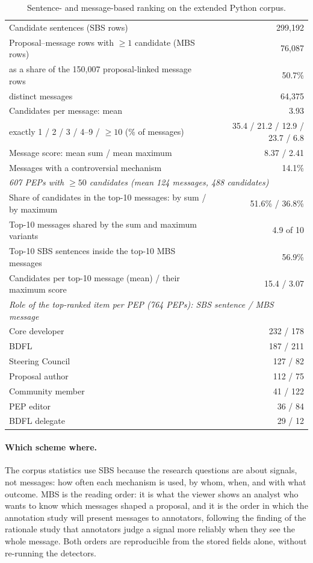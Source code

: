 \begin{table}[t]
\caption{Sentence- and message-based ranking on the extended Python corpus.}
\label{tab:mbs}
\footnotesize
\setlength{\tabcolsep}{4pt}
\begin{tabular}{p{}r}
\toprule
Candidate sentences (SBS rows) & 299,192 \\
Proposal--message rows with $\geq 1$ candidate (MBS rows) & 76,087 \\
\quad as a share of the 150,007 proposal-linked message rows & 50.7\% \\
\quad distinct messages & 64,375 \\
Candidates per message: mean & 3.93 \\
\quad exactly 1 / 2 / 3 / 4--9 / $\geq 10$ (\% of messages) & 35.4 / 21.2 / 12.9 / 23.7 / 6.8 \\
Message score: mean sum / mean maximum & 8.37 / 2.41 \\
Messages with a controversial mechanism & 14.1\% \\
\midrule
\multicolumn{2}{l}{\emph{607 PEPs with $\geq 50$ candidates (mean 124 messages, 488 candidates)}} \\
Share of candidates in the top-10 messages: by sum / by maximum & 51.6\% / 36.8\% \\
Top-10 messages shared by the sum and maximum variants & 4.9 of 10 \\
Top-10 SBS sentences inside the top-10 MBS messages & 56.9\% \\
Candidates per top-10 message (mean) / their maximum score & 15.4 / 3.07 \\
\midrule
\multicolumn{2}{l}{\emph{Role of the top-ranked item per PEP (764 PEPs): SBS sentence / MBS message}} \\
Core developer & 232 / 178 \\
BDFL & 187 / 211 \\
Steering Council & 127 / 82 \\
Proposal author & 112 / 75 \\
Community member & 41 / 122 \\
PEP editor & 36 / 84 \\
BDFL delegate & 29 / 12 \\
\bottomrule
\end{tabular}
\end{table}

\paragraph{Which scheme where.} The corpus statistics use SBS because the research questions are about signals, not messages: how often each mechanism is used, by whom, when, and with what outcome. MBS is the reading order: it is what the viewer shows an analyst who wants to know which messages shaped a proposal, and it is the order in which the annotation study will present messages to annotators, following the finding of the rationale study that annotators judge a signal more reliably when they see the whole message. Both orders are reproducible from the stored fields alone, without re-running the detectors.
